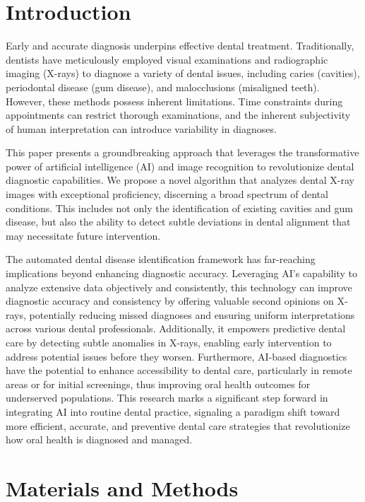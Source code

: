 \documentclass[journal,twoside,web]{ieeecolor}
\begin{document}
\section{Introduction}
\label{sec:introduction}
Early and accurate diagnosis underpins effective dental treatment. 
Traditionally, dentists have meticulously employed visual examinations and 
radiographic imaging (X-rays) to diagnose a variety of dental issues, 
including caries (cavities), periodontal disease (gum disease), 
and malocclusions (misaligned teeth). 
However, these methods possess inherent limitations. 
Time constraints during 
appointments can restrict thorough examinations, and the inherent subjectivity of human 
interpretation can introduce variability in diagnoses.

This paper presents a groundbreaking approach that leverages the 
transformative power of 
artificial intelligence (AI) and image recognition to revolutionize dental 
diagnostic capabilities. We propose a novel algorithm that 
analyzes dental X-ray images with exceptional proficiency, discerning a broad 
spectrum of dental conditions. This includes not 
only the identification of existing 
cavities and gum disease, but also the ability to detect subtle 
deviations in dental alignment that may necessitate future intervention.

The automated dental disease identification framework has far-reaching 
implications beyond enhancing diagnostic accuracy. Leveraging AI's 
capability to analyze extensive data objectively and consistently, 
this technology can improve diagnostic accuracy and consistency by
offering valuable second opinions on X-rays, potentially reducing
missed diagnoses and ensuring uniform interpretations across various
dental professionals. Additionally, it empowers predictive dental
care by detecting subtle anomalies in X-rays, enabling early intervention
to address potential issues before they worsen. Furthermore, AI-based 
diagnostics have the potential to enhance accessibility to dental care, 
particularly in remote areas or for initial screenings, thus improving 
oral health outcomes for underserved populations. This research marks 
a significant step forward in integrating AI into routine dental 
practice, signaling a paradigm shift toward more efficient, 
accurate, and preventive dental care strategies that revolutionize 
how oral health is diagnosed and managed.



\section{Materials and Methods}
\end{document}
